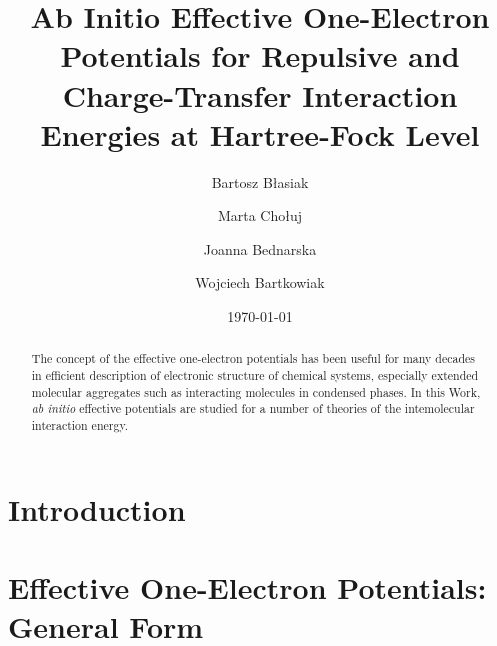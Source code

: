 


\title{Ab Initio Effective One-Electron Potentials 
for Repulsive and Charge-Transfer Interaction Energies at Hartree-Fock Level}

\author{Bartosz B{\l}asiak}

\author{Marta Cho{\l}uj} 
\author{Joanna Bednarska}
\author{Wojciech Bartkowiak}


\date{\today}

\begin{abstract}
The concept of the effective one-electron potentials has been useful for many decades
in efficient description of electronic structure of chemical systems, especially extended
molecular aggregates such as interacting molecules in condensed phases. 
In this Work, \emph{ab initio} effective potentials are studied for a number of theories
of the intemolecular interaction energy.
\end{abstract}

\pacs{}

\maketitle

\tableofcontents

\section{\label{s:1}Introduction}

\section{\label{s:2}Effective One-Electron Potentials: General Form}

